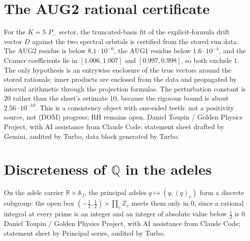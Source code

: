 \documentclass{report}
\theoremstyle{definition}
\begin{document}
\begin{itemize}
\begin{itemize}
\section{The AUG2 rational certificate}
For the $K=5$ $P_-$ sector, the truncated-basis fit of the explicit-formula drift vector $D$ against the two spectral orbitals is certified from the stored run data. The AUG2 residue is below $8.1\cdot10^{-6}$, the AUG1 residue below $1.6\cdot10^{-4}$, and the Cramer coefficients lie in $[1.006,1.007]$ and $[0.997,0.998]$, so both exclude $1$. The only hypothesis is an entrywise enclosure of the true vectors around the stored rationals; inner products are enclosed from the data and propagated by interval arithmetic through the projection formulas. The perturbation constant is $20$ rather than the sheet's estimate $10$, because the rigorous bound is about $2.56\cdot10^{-10}$. This is a consistency object with one-sided teeth: not a positivity source, not (DOM) progress; RH remains open.
Daniel Toupin / Golden Physics Project, with AI assistance from Claude Code; statement sheet drafted by Gemini, audited by Turbo, data block generated by Turbo.

\section{Discreteness of $\mathbb Q$ in the adeles}
On the adele carrier $\mathbb R\times\mathbb A_f$, the principal adeles $q\mapsto(q,(q)_v)$ form a discrete subgroup: the open box $(-\tfrac12,\tfrac12)\times\prod_v\mathbb Z_v$ meets them only in $0$, since a rational integral at every prime is an integer and an integer of absolute value below $\tfrac12$ is $0$.
Daniel Toupin / Golden Physics Project, with AI assistance from Claude Code; statement sheet by Principal series, audited by Turbo.


\end{itemize}
\end{itemize}
\end{document}
